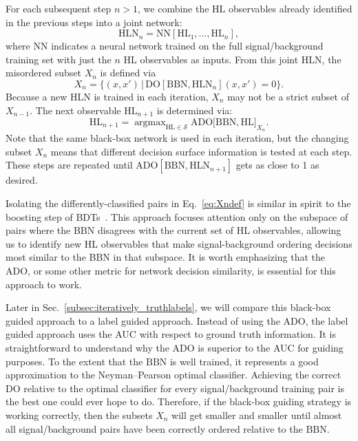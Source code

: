 \documentclass[aps,prd,twocolumn,superscriptaddress,preprintnumbers,nofootinbib,longbibliography,floatfix]{revtex4-1}
\newcommand{\BBN}{\text{BBN}}
\newcommand{\HLN}{\text{HLN}}
\newcommand{\DO}{\text{DO}}
\newcommand{\NN}{\text{NN}}
\newcommand{\HL}{\text{HL}}
\newcommand{\ADO}{\text{ADO}}
\DeclareMathOperator*{\argmax}{argmax}
\newcommand{\Sec}[1]{Sec.~\ref{#1}}
\newcommand{\Eq}[1]{Eq.~\eqref{#1}}
\begin{document}
For each subsequent step $n > 1$, we combine the HL observables already identified in the previous steps into a joint network:
\begin{equation}
	\label{eq:HLCn_def}
	\HLN_{n} = \NN[\HL_1, \ldots, \HL_{n}],
\end{equation}
where $\NN$ indicates a neural network trained on the full signal/background training set with just the $n$ HL observables as inputs. From this joint $\HLN$, the misordered subset $X_{n}$ is defined via
\begin{equation}
	\label{eq:Xndef}
	X_{n} = \Big\{ (x,x') \, \Big| \, \DO[\BBN,\HLN_n](x,x') = 0 \Big\}.
\end{equation}
Because a new $\HLN$ is trained in each iteration, $X_{n}$ may not be a strict subset of $X_{n-1}$. The next observable $\HL_{n+1}$ is determined via:
\begin{equation}
	\label{eq:HLn1_def}
	\HL_{n+1} = \argmax_{\HL \in \mathcal{S}} \ADO\big[\BBN, \HL \big]_{X_{n}}.
\end{equation}
Note that the same black-box network is used in each iteration, but the changing subset $X_{n}$ means that different decision surface information is tested at each step. These steps are repeated until $\ADO[\BBN, \HLN_{n+1}]$ gets as close to 1 as desired.

Isolating the differently-classified pairs in \Eq{eq:Xndef} is similar in spirit to the boosting step of BDTs~\cite{10.1023/A:1022648800760,FREUND1995256}. This approach focuses attention only on the subspace of pairs where the $\BBN$ disagrees with the current set of HL observables, allowing us to identify new HL observables that make signal-background ordering decisions most similar to the BBN in that subspace. It is worth emphasizing that the ADO, or some other metric for network decision similarity, is essential for this approach to work.

Later in \Sec{subsec:iteratively_truthlabels}, we will compare this black-box guided approach to a label guided approach. Instead of using the ADO, the label guided approach uses the AUC with respect to ground truth information. It is straightforward to understand why the ADO is superior to the AUC for guiding purposes. To the extent that the $\BBN$ is well trained, it represents a good approximation to the Neyman--Pearson optimal classifier. Achieving the correct DO relative to the optimal classifier for every signal/background training pair is the best one could ever hope to do. Therefore, if the black-box guiding strategy is working correctly, then the subsets $X_{n}$ will get smaller and smaller until almost all signal/background pairs have been correctly ordered relative to the $\BBN$.
\end{document}
